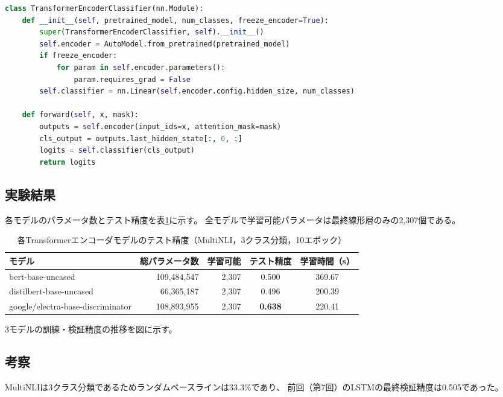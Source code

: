 \documentclass[twoside,11pt]{article}
\begin{document}
\begin{lstlisting}[language=Python]
class TransformerEncoderClassifier(nn.Module):
    def __init__(self, pretrained_model, num_classes, freeze_encoder=True):
        super(TransformerEncoderClassifier, self).__init__()
        self.encoder = AutoModel.from_pretrained(pretrained_model)
        if freeze_encoder:
            for param in self.encoder.parameters():
                param.requires_grad = False
        self.classifier = nn.Linear(self.encoder.config.hidden_size, num_classes)

    def forward(self, x, mask):
        outputs = self.encoder(input_ids=x, attention_mask=mask)
        cls_output = outputs.last_hidden_state[:, 0, :]
        logits = self.classifier(cls_output)
        return logits
\end{lstlisting}

\subsection*{実験結果}

各モデルのパラメータ数とテスト精度を表\ref{tab:transformer_result}に示す。
全モデルで学習可能パラメータは最終線形層のみの2,307個である。

\begin{table}[H]
\centering
\caption{各Transformerエンコーダモデルのテスト精度（MultiNLI，3クラス分類，10エポック）}
\label{tab:transformer_result}
\begin{tabular}{lrrcc}
\toprule
モデル & 総パラメータ数 & 学習可能 & テスト精度 & 学習時間（s） \\
\midrule
bert-base-uncased                 & 109,484,547 & 2,307 & 0.500 & 369.67 \\
distilbert-base-uncased           &  66,365,187 & 2,307 & 0.496 & 200.39 \\
google/electra-base-discriminator & 108,893,955 & 2,307 & \textbf{0.638} & 220.41 \\
\bottomrule
\end{tabular}
\end{table}

3モデルの訓練・検証精度の推移を図に示す。

\subsection*{考察}

MultiNLIは3クラス分類であるためランダムベースラインは33.3\%であり、
前回（第7回）のLSTMの最終検証精度は0.505であった。
\end{document}
